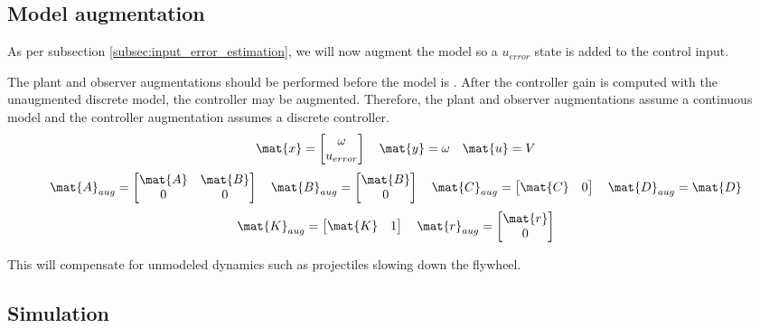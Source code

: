 \subsection{Model augmentation}

As per subsection \ref{subsec:input_error_estimation}, we will now augment the
\gls{model} so a $u_{error}$ state is added to the \gls{control input}.

The \gls{plant} and \gls{observer} augmentations should be performed before the
\gls{model} is . After the \gls{controller}
gain is computed with the unaugmented discrete \gls{model}, the controller may
be augmented. Therefore, the \gls{plant} and \gls{observer} augmentations assume
a continuous \gls{model} and the \gls{controller} augmentation assumes a
discrete \gls{controller}.
\begin{equation*}
  \mat{x} =
  \begin{bmatrix}
    \omega \\
    u_{error}
  \end{bmatrix}
  \quad
  \mat{y} = \omega
  \quad
  \mat{u} = V
\end{equation*}
\begin{equation}
  \mat{A}_{aug} =
  \begin{bmatrix}
    \mat{A} & \mat{B} \\
    0 & 0
  \end{bmatrix}
  \quad
  \mat{B}_{aug} =
  \begin{bmatrix}
    \mat{B} \\
    0
  \end{bmatrix}
  \quad
  \mat{C}_{aug} = \begin{bmatrix}
    \mat{C} & 0
  \end{bmatrix}
  \quad
  \mat{D}_{aug} = \mat{D}
\end{equation}
\begin{equation}
  \mat{K}_{aug} = \begin{bmatrix}
    \mat{K} & 1
  \end{bmatrix}
  \quad
  \mat{r}_{aug} = \begin{bmatrix}
    \mat{r} \\
    0
  \end{bmatrix}
\end{equation}

This will compensate for unmodeled dynamics such as projectiles slowing down the
flywheel.

\subsection{Simulation}

